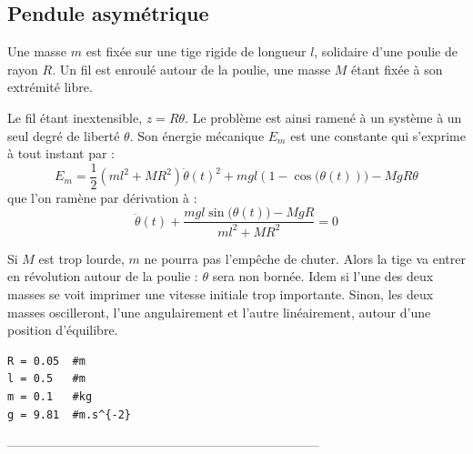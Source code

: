 \subsection{Pendule asymétrique}
\begin{minipage}[c]{.60\linewidth}
Une masse $m$ est fixée sur une tige rigide de longueur $l$, solidaire d'une poulie de rayon $R$. Un fil est enroulé autour de la poulie, une masse $M$ étant fixée à son extrémité libre.

Le fil étant inextensible, $z=R\theta$. Le problème est ainsi ramené à un système à un seul degré de liberté $\theta$. 
Son énergie mécanique $E_m$ est une constante qui s'exprime à tout instant par :
	\[
	E_m=\frac{1}{2}(ml^2+MR^2)\dot{\theta}(t)^2+mgl(1-\cos\bigl(\theta(t))\bigr)-MgR\theta
	\]
que l'on ramène par dérivation à :
	\[
	\ddot{\theta}(t)+\frac{mgl\sin\bigl(\theta(t)\bigr)-MgR}{ml^2+MR^2}=0
	\]
\end{minipage}  
\begin{minipage}[c]{.40\linewidth}
\begin{center}
\end{center}
\end{minipage}  

\medskip


Si $M$ est trop lourde, $m$ ne pourra pas l'empêche de chuter. Alors la tige va entrer en révolution autour de la poulie : $\theta$ sera non bornée. Idem si l'une des deux masses se voit imprimer une vitesse initiale trop importante. Sinon, les deux masses oscilleront, l'une angulairement et l'autre linéairement, autour d'une position d'équilibre.
\begin{lstlisting}
R = 0.05  #m
l = 0.5   #m
m = 0.1   #kg
g = 9.81  #m.s^{-2}
\end{lstlisting}
--------------------------------------------------------------------------

